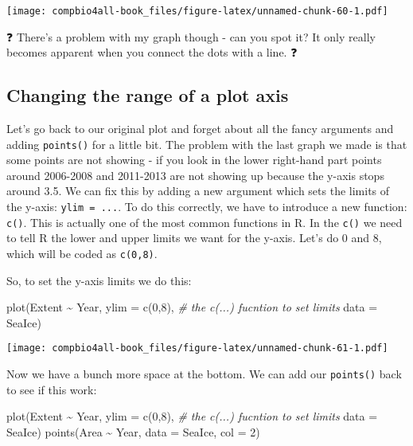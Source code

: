 \documentclass[
]{book}
\newenvironment{Shaded}{\begin{snugshade}}{\end{snugshade}}
\newcommand{\AttributeTok}[1]{\textcolor[rgb]{0.77,0.63,0.00}{#1}}
\newcommand{\CommentTok}[1]{\textcolor[rgb]{0.56,0.35,0.01}{\textit{#1}}}
\newcommand{\DecValTok}[1]{\textcolor[rgb]{0.00,0.00,0.81}{#1}}
\newcommand{\FunctionTok}[1]{\textcolor[rgb]{0.00,0.00,0.00}{#1}}
\newcommand{\NormalTok}[1]{#1}
\newcommand{\SpecialCharTok}[1]{\textcolor[rgb]{0.00,0.00,0.00}{#1}}
\begin{document}
\texttt{[image: compbio4all-book\_files/figure-latex/unnamed-chunk-60-1.pdf]}

❓ There's a problem with my graph though - can you spot it? It only really becomes apparent when you connect the dots with a line. ❓

\hypertarget{changing-the-range-of-a-plot-axis}{%
\subsection{Changing the range of a plot axis}\label{changing-the-range-of-a-plot-axis}}

Let's go back to our original plot and forget about all the fancy arguments and adding \texttt{points()} for a little bit. The problem with the last graph we made is that some points are not showing - if you look in the lower right-hand part points around 2006-2008 and 2011-2013 are not showing up because the y-axis stops around 3.5. We can fix this by adding a new argument which sets the limits of the y-axis: \texttt{ylim\ =\ ...}. To do this correctly, we have to introduce a new function: \texttt{c()}. This is actually one of the most common functions in R. In the \texttt{c()} we need to tell R the lower and upper limits we want for the y-axis. Let's do 0 and 8, which will be coded as \texttt{c(0,8)}.

So, to set the y-axis limits we do this:

\begin{Shaded}
\begin{Highlighting}[]
\FunctionTok{plot}\NormalTok{(Extent }\SpecialCharTok{\textasciitilde{}}\NormalTok{ Year,  }
     \AttributeTok{ylim =} \FunctionTok{c}\NormalTok{(}\DecValTok{0}\NormalTok{,}\DecValTok{8}\NormalTok{), }\CommentTok{\# the c(...) fucntion to set limits}
     \AttributeTok{data =}\NormalTok{ SeaIce) }
\end{Highlighting}
\end{Shaded}

\texttt{[image: compbio4all-book\_files/figure-latex/unnamed-chunk-61-1.pdf]}

Now we have a bunch more space at the bottom. We can add our \texttt{points()} back to see if this work:

\begin{Shaded}
\begin{Highlighting}[]
\FunctionTok{plot}\NormalTok{(Extent }\SpecialCharTok{\textasciitilde{}}\NormalTok{ Year,  }
     \AttributeTok{ylim =} \FunctionTok{c}\NormalTok{(}\DecValTok{0}\NormalTok{,}\DecValTok{8}\NormalTok{), }\CommentTok{\# the c(...) fucntion to set limits}
     \AttributeTok{data =}\NormalTok{ SeaIce) }
\FunctionTok{points}\NormalTok{(Area }\SpecialCharTok{\textasciitilde{}}\NormalTok{ Year,}
      \AttributeTok{data =}\NormalTok{ SeaIce,}
      \AttributeTok{col =} \DecValTok{2}\NormalTok{)}
\end{Highlighting}
\end{Shaded}
\end{document}
